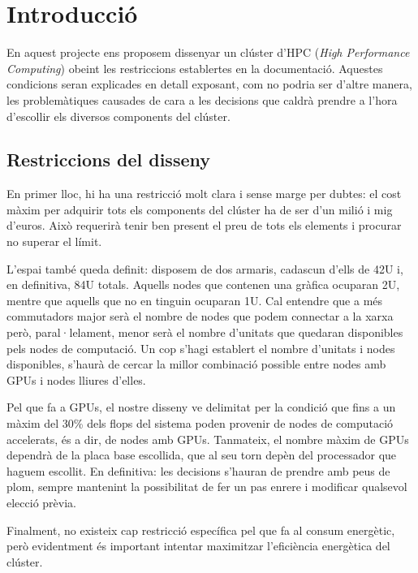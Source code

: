 \section{Introducció}\label{sec:intro}

En aquest projecte ens proposem dissenyar un clúster d'HPC (\textit{High Performance Computing}) obeint les restriccions establertes en la documentació. Aquestes condicions seran explicades en detall exposant, com no podria ser d'altre manera, les problemàtiques causades de cara a les decisions que caldrà prendre a l'hora d'escollir els diversos components del clúster.

\subsection{Restriccions del disseny}
En primer lloc, hi ha una restricció molt clara i sense marge per dubtes: el cost màxim per adquirir tots els components del clúster ha de ser d'un milió i mig d'euros. Això requerirà tenir ben present el preu de tots els elements i procurar no superar el límit.

L'espai també queda definit: disposem de dos armaris, cadascun d'ells de 42U i, en definitiva, 84U totals. Aquells nodes que contenen una gràfica ocuparan 2U, mentre que aquells que no en tinguin ocuparan 1U. Cal entendre que a més commutadors major serà el nombre de nodes que podem connectar a la xarxa però, paral·lelament, menor serà el nombre d'unitats que quedaran disponibles pels nodes de computació. Un cop s'hagi establert el nombre d'unitats i nodes disponibles, s'haurà de cercar la millor combinació possible entre nodes amb GPUs i nodes lliures d'elles.

Pel que fa a GPUs, el nostre disseny ve delimitat per la condició que fins a un màxim del 30\% dels flops del sistema poden provenir de nodes de computació accelerats, és a dir, de nodes amb GPUs. Tanmateix, el nombre màxim de GPUs dependrà de la placa base escollida, que al seu torn depèn del processador que haguem escollit. En definitiva: les decisions s'hauran de prendre amb peus de plom, sempre mantenint la possibilitat de fer un pas enrere i modificar qualsevol elecció prèvia.

Finalment, no existeix cap restricció específica pel que fa al consum energètic, però evidentment és important intentar maximitzar l'eficiència energètica del clúster. 


